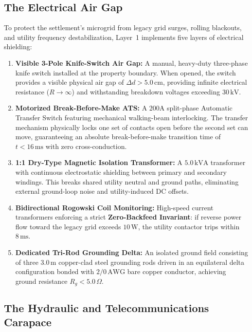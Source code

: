 \subsection{The Electrical Air Gap}

To protect the settlement's microgrid from legacy grid surges, rolling blackouts, and utility frequency destabilization, Layer~1 implements five layers of electrical shielding:

\begin{enumerate}
    \item \textbf{Visible 3-Pole Knife-Switch Air Gap:} A manual, heavy-duty three-phase knife switch installed at the property boundary. When opened, the switch provides a visible physical air gap of $\Delta d > 5.0\,\mathrm{cm}$, providing infinite electrical resistance ($R \to \infty$) and withstanding breakdown voltages exceeding $30\,\mathrm{kV}$.
    \item \textbf{Motorized Break-Before-Make ATS:} A 200A split-phase Automatic Transfer Switch featuring mechanical walking-beam interlocking. The transfer mechanism physically locks one set of contacts open before the second set can move, guaranteeing an absolute break-before-make transition time of $t < 16\,\mathrm{ms}$ with zero cross-conduction.
    \item \textbf{1:1 Dry-Type Magnetic Isolation Transformer:} A $5.0\,\mathrm{kVA}$ transformer with continuous electrostatic shielding between primary and secondary windings. This breaks shared utility neutral and ground paths, eliminating external ground-loop noise and utility-induced DC offsets.
    \item \textbf{Bidirectional Rogowski Coil Monitoring:} High-speed current transformers enforcing a strict \textbf{Zero-Backfeed Invariant}: if reverse power flow toward the legacy grid exceeds $10\,\mathrm{W}$, the utility contactor trips within $8\,\mathrm{ms}$.
    \item \textbf{Dedicated Tri-Rod Grounding Delta:} An isolated ground field consisting of three $3.0\,\mathrm{m}$ copper-clad steel grounding rods driven in an equilateral delta configuration bonded with $2/0\,\mathrm{AWG}$ bare copper conductor, achieving ground resistance $R_g < 5.0\,\Omega$.
\end{enumerate}

\subsection{The Hydraulic and Telecommunications Carapace}

